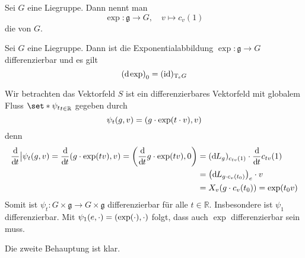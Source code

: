 \begin{definition}
	Sei $G$ eine Liegruppe.
	Dann nennt man 
	\[
		\exp \colon \mathfrak{g} \longrightarrow G ,\quad  v \longmapsto c_v(1)
	\]
	die  von $G$. 
\end{definition}

\begin{lemma}
	Sei $G$ eine Liegruppe.
	Dann ist die Exponentialabbildung $\exp \colon \mathfrak{g} \to G$ differenzierbar und es gilt 
	\[
		\enbrace*{\mathd \exp}_0 = (\id)_{\Tmap_e G}
	\]
\end{lemma}
\begin{beweis}
	Wir betrachten das Vektorfeld
	$S$ ist ein differenzierbares Vektorfeld mit globalem Fluss $\set*{\psi_t}_{t \in \mathbb{R}}$ gegeben durch 
	\[
		\psi_t(g,v) = \enbrace*{g \cdot \exp(t \cdot v),v}
	\]
	denn
	\begin{align}
		\diffd{}{t}\big| \psi_t (g,v) = \diffd{}{t} \enbrace*{g \cdot \exp(tv),v} = \enbrace*{\diffd{}{t} g \cdot \exp(tv),0} &= (\mathd L_g)_{c_{tv}(1)} \cdot \diffd{}{t} c_{tv}(1) \\
		&= \enbrace*{\mathd L_{g \cdot c_v(t_0)}}_e \cdot v \\
		&= X_v \enbrace*{g \cdot c_v(t_0)} = \exp(t_0 v)
	\end{align}
	Somit ist $\psi_t \colon G \times \mathfrak{g} \to G \times \mathfrak{g}$ differenzierbar für alle $t \in \mathbb{R}$.
	Insbesondere ist $\psi_1$ differenzierbar.
	Mit $\psi_1(e,\cdot ) = \enbrace*{\exp(\cdot ), \cdot }$ folgt, dass auch $\exp$ differenzierbar sein muss.
	
	Die zweite Behauptung ist klar.
\end{beweis}

